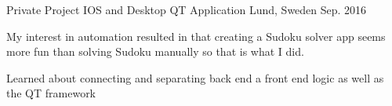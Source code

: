 \begin{cventries}
\cventry
{Private Project} %
{IOS and Desktop QT Application } %
{Lund, Sweden} %
{Sep. 2016 } %
{ %
\begin{cvitems}
\item {My interest in automation resulted in that creating a Sudoku solver app
seems more fun than solving Sudoku manually so that is what I did.}
\item {Learned about connecting and separating back end a front end logic
as well as the QT framework }
\end{cvitems}
}


\end{cventries}
